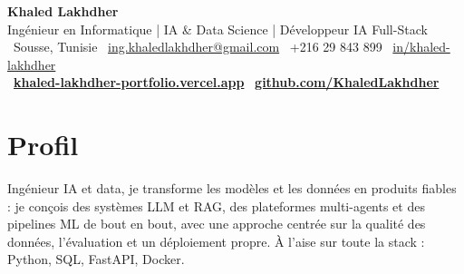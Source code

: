 \documentclass[11pt,a4paper]{article}
\begin{document}
\raggedright   %

\begin{center}
  {\LARGE\bfseries\color{accent} Khaled Lakhdher}\\[3pt]
  {\large\color{muted} Ingénieur en Informatique \;|\; IA \& Data Science \;|\; Développeur IA Full-Stack}\\[5pt]
  {\small\color{muted}
    {\color{accent}\faMapMarker}~Sousse, Tunisie \quad\textbar\quad
    {\color{accent}\faEnvelope}~\href{mailto:ing.khaledlakhdher@gmail.com}{ing.khaledlakhdher@gmail.com} \quad\textbar\quad
    {\color{accent}\faPhone}~+216 29 843 899 \quad\textbar\quad
    {\color{accent}\faLinkedin}~\href{https://www.linkedin.com/in/khaled-lakhdher}{in/khaled-lakhdher}
  }\\[3pt]
  {\small {\color{accent}\faGlobe}~\href{https://khaled-lakhdher-portfolio.vercel.app}{\textbf{\color{accent}khaled-lakhdher-portfolio.vercel.app}} \quad\textbar\quad {\color{accent}\faGithub}~\href{https://github.com/KhaledLakhdher}{\textbf{\color{accent}github.com/KhaledLakhdher}}}
\end{center}

\section{Profil}
Ingénieur IA et data, je transforme les modèles et les données en produits fiables : je conçois des systèmes
LLM et RAG, des plateformes multi-agents et des pipelines ML de bout en bout, avec une approche centrée sur la
qualité des données, l'évaluation et un déploiement propre. À l'aise sur toute la stack : Python, SQL, FastAPI, Docker.

\end{document}
